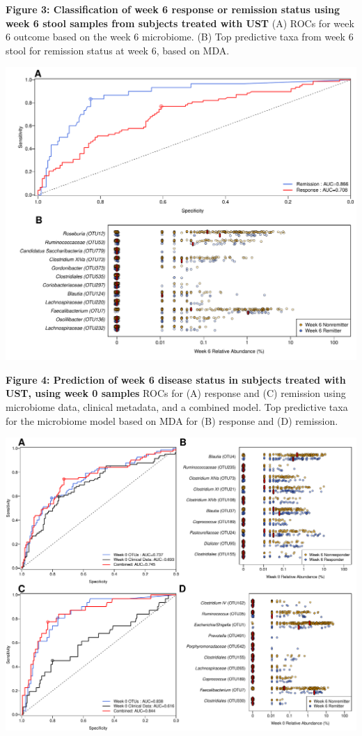 \documentclass[11pt,]{article}
\begin{document}
\newpage

\textbf{Figure 3: Classification of week 6 response or remission status
using week 6 stool samples from subjects treated with UST} (A) ROCs for
week 6 outcome based on the week 6 microbiome. (B) Top predictive taxa
from week 6 stool for remission status at week 6, based on MDA.

\includegraphics{figures/Figure3_wk6Xwk6.pdf}

\newpage

\textbf{Figure 4: Prediction of week 6 disease status in subjects
treated with UST, using week 0 samples} ROCs for (A) response and (C)
remission using microbiome data, clinical metadata, and a combined
model. Top predictive taxa for the microbiome model based on MDA for (B)
response and (D) remission.

\includegraphics{figures/Figure4_wk0Xwk6pred.pdf}
\end{document}
